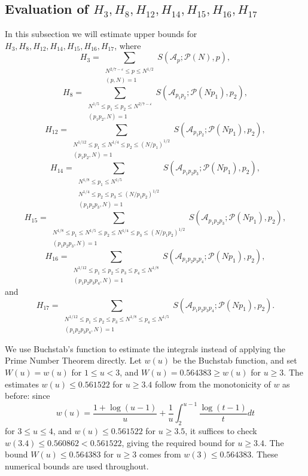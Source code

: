 \documentclass[12pt, a4paper]{amsart}
\def \N {{\mathbb N}}
\def\leq{\leqslant}
\def\le{\leqslant}
\def\ge{\geqslant}
\theoremstyle{plain}
\theoremstyle{remark}
\numberwithin{equation}{section}
\begin{document}
\subsection{Evaluation of $H_{3},H_{8},H_{12},H_{14},H_{15},H_{16},H_{17}$}
In this subsection we will estimate upper bounds for $H_{3},H_{8},H_{12},H_{14},H_{15},H_{16},H_{17}$, where
\[
H_3 =\sum_{\substack{N^{2/7-\varepsilon}\le p\le N^{1/2} \\(p, N)=1}}S(\mathscr{A}_p ; \mathscr{P}(N), p),
\]
\[
H_8 = \sum_{\substack{N^{1/5} \leq p_1 \le p_2 \le N^{2/7-\varepsilon} \\ (p_1 p_2, N) = 1}} S(\mathscr{A}_{p_1 p_2}; \mathscr{P}(N p_1), p_2),
\]
\[
H_{12} = \sum_{\substack{N^{1/12} \leq p_1 \le N^{1/4}\leq p_2 \le (N/p_1)^{1/2} \\ (p_1 p_2, N) = 1}} S(\mathscr{A}_{p_1 p_2}; \mathscr{P}(N p_1), p_2),
\]
\[
H_{14} = \sum_{\substack{N^{1/8} \le p_1\le N^{1/5}\\N^{1/4} \le p_2\le p_3\le (N/p_1p_2)^{1/2} \\ (p_1 p_2 p_3, N) = 1}}  S(\mathscr{A}_{p_1 p_2 p_3}; \mathscr{P}(Np_1), p_2),
\]
\[
H_{15} = \sum_{\substack{N^{1/8} \le p_1\le N^{1/5} \le p_2\le N^{1/4}\le p_3\le (N/p_1p_2)^{1/2} \\ (p_1 p_2 p_3, N) = 1}}  S(\mathscr{A}_{p_1 p_2 p_3}; \mathscr{P}(Np_1), p_2),
\]
\[
H_{16} = \sum_{\substack{N^{1/12} \leq p_1 \le p_2 \le p_3 \le p_4 \le N^{1/8} \\ (p_1 p_2 p_3 p_4, N) = 1}} S(\mathscr{A}_{p_1 p_2 p_3 p_4}; \mathscr{P}(Np_1), p_2),
\]
and 
\[
H_{17} = \sum_{\substack{N^{1/12} \leq p_1 \le p_2 \le p_3 \le N^{1/8} \leq p_4 \le N^{1/5}\\ (p_1 p_2 p_3 p_4, N) = 1}} S(\mathscr{A}_{p_1 p_2 p_3 p_4}; \mathscr{P}(Np_1), p_2).
\]

We use Buchstab’s function to estimate the integrals instead of applying the Prime Number Theorem directly.  
Let $w(u)$ be the Buchstab function, and set $W(u)=w(u)$ for $1\le u<3$, and $W(u)=0.564383\ge w(u)$ for $u\ge 3$.
The estimates $w(u)\le 0.561522$ for $u\ge 3.4$ follow from the monotonicity of $w$ as before:
since 
$$
w(u)=\frac{1+\log(u-1)}{u}+\frac{1}{u}\int_{2}^{u-1}\frac{\log(t-1)}{t}dt
$$ 
for $3\le u\le 4$, and $w(u)\le 0.561522$ for $u\ge 3.5$,
it suffices to check $w(3.4)\le 0.560862<0.561522$, giving the required bound for $u\ge 3.4$. The bound $W(u)\le 0.564383$ for $u\ge 3$ comes from $w(3)\le 0.564383$. These numerical bounds are used throughout. 
\end{document}
